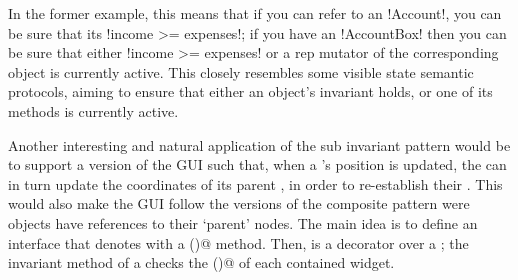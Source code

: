 In the former example, this means that
if you can refer to an \Q!Account!, you can be sure that its \Q!income >= expenses!;
if you have an \Q!AccountBox! then you can be sure that either \Q!income >= expenses! or 
a rep mutator of the corresponding \Q@Account@ object is currently active.
This closely resembles some visible state semantic protocols, aiming to ensure that  
either an object's invariant holds, or one of its methods is currently active.


Another interesting and natural application of the sub invariant pattern would be to support a version of the GUI such that, when a \Q@Widget@'s position is updated, the \Q@Widget@ can in turn update the coordinates of its parent \Q@Widget@s, in order to re-establish their \Q@subInvariants@.
This would also make the GUI follow the versions of the composite pattern were objects have references to their `parent' nodes.
The main idea is to define an interface \Q@HasSubInvariant@ that denotes \Q@Widgets@ with a \Q@subInvariant()@ method. Then, \Q@WidgetWithInvariant@ is a decorator over a \Q@Widget@; the invariant method of a \Q@WidgetWithInvariant@ checks the \Q@subInvariant()@ of each contained widget.


